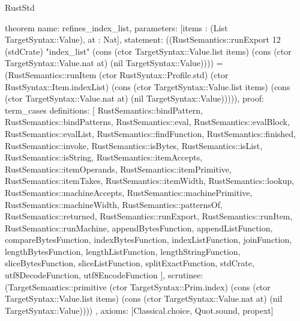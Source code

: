 \begin{lexlean}{RustStd}
\begin{semanticmodule}
theorem{
  name: refines_index_list,
  parameters: [items : (List TargetSyntax::Value), at : Nat],
  statement: ((RustSemantics::runExport 12 (stdCrate) "index_list" (cons (ctor TargetSyntax::Value.list items) (cons (ctor TargetSyntax::Value.nat at) (nil TargetSyntax::Value)))) = (RustSemantics::runItem (ctor RustSyntax::Profile.std) (ctor RustSyntax::Item.indexList) (cons (ctor TargetSyntax::Value.list items) (cons (ctor TargetSyntax::Value.nat at) (nil TargetSyntax::Value))))),
  proof: term_cases{
    definitions: [
      RustSemantics::bindPattern,
      RustSemantics::bindPatterns,
      RustSemantics::eval,
      RustSemantics::evalBlock,
      RustSemantics::evalList,
      RustSemantics::findFunction,
      RustSemantics::finished,
      RustSemantics::invoke,
      RustSemantics::isBytes,
      RustSemantics::isList,
      RustSemantics::isString,
      RustSemantics::itemAccepts,
      RustSemantics::itemOperands,
      RustSemantics::itemPrimitive,
      RustSemantics::itemTakes,
      RustSemantics::itemWidth,
      RustSemantics::lookup,
      RustSemantics::machineAccepts,
      RustSemantics::machinePrimitive,
      RustSemantics::machineWidth,
      RustSemantics::patternsOf,
      RustSemantics::returned,
      RustSemantics::runExport,
      RustSemantics::runItem,
      RustSemantics::runMachine,
      appendBytesFunction,
      appendListFunction,
      compareBytesFunction,
      indexBytesFunction,
      indexListFunction,
      joinFunction,
      lengthBytesFunction,
      lengthListFunction,
      lengthStringFunction,
      sliceBytesFunction,
      sliceListFunction,
      splitExactFunction,
      stdCrate,
      utf8DecodeFunction,
      utf8EncodeFunction
    ],
    scrutinee: (TargetSemantics::primitive (ctor TargetSyntax::Prim.index) (cons (ctor TargetSyntax::Value.list items) (cons (ctor TargetSyntax::Value.nat at) (nil TargetSyntax::Value))))
  },
  axioms: [Classical.choice, Quot.sound, propext]
}


\end{semanticmodule}
\end{lexlean}
